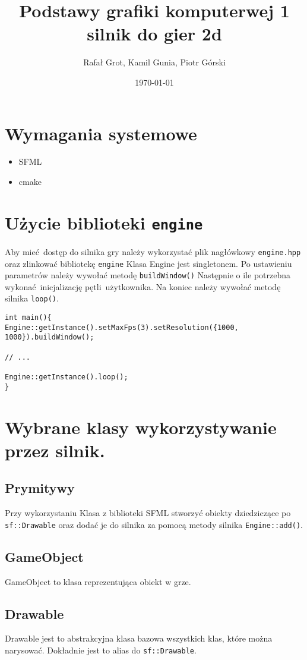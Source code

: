 \documentclass[11pt]{article}
\author{Rafał Grot, Kamil Gunia, Piotr Górski}
\date{\today}
\title{Podstawy grafiki komputerwej 1 silnik do gier 2d}
\begin{document}
\maketitle
\newpage
\section{Wymagania systemowe}
\label{sec:orgfd622d0}
\begin{itemize}
\item SFML
\item cmake
\end{itemize}
\section{Użycie biblioteki \texttt{engine}}
\label{sec:orgf41cd77}
Aby mieć dostęp do silnika gry należy wykorzystać plik nagłówkowy \texttt{engine.hpp} oraz zlinkować bibliotekę \texttt{engine}
Klasa Engine jest singletonem.
Po ustawieniu parametrów należy wywołać metodę \texttt{buildWindow()}
Następnie o ile potrzebna wykonać inicjalizację pętli użytkownika.
Na koniec należy wywołać metodę silnika \texttt{loop()}.

\begin{verbatim}
int main(){
Engine::getInstance().setMaxFps(3).setResolution({1000, 1000}).buildWindow();

// ...

Engine::getInstance().loop();
}
\end{verbatim}
\section{Wybrane klasy wykorzystywanie przez silnik.}
\label{sec:orgdfc93f2}
\subsection{Prymitywy}
\label{sec:orgeb36976}
Przy wykorzystaniu Klasa z biblioteki SFML stworzyć obiekty dziedziczące po \texttt{sf::Drawable} oraz dodać je do silnika za pomocą metody silnika \texttt{Engine::add()}.
\subsection{GameObject}
\label{sec:org0acd6e2}
GameObject to klasa reprezentująca obiekt w grze.
\subsection{Drawable}
\label{sec:orged9142e}
Drawable jest to abstrakcyjna klasa bazowa wszystkich klas, które można narysować.
Dokładnie jest to alias do \texttt{sf::Drawable}.
\end{document}
